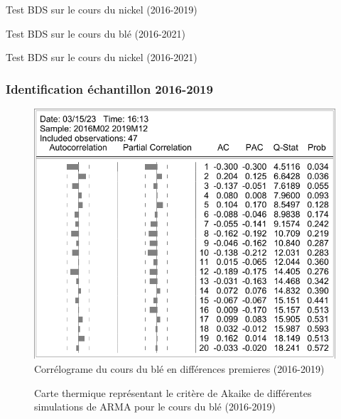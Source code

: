 \documentclass[12pt,a4paper]{article}
\begin{document}
\begin{table}[H]
    \centering
    \caption{Test BDS sur le cours du nickel (2016-2019)}
    \sffamily
    \resizebox{0.9\textwidth}{!}{}
\end{table}

\begin{table}[H]
    \centering
    \caption{Test BDS sur le cours du blé (2016-2021)}
    \sffamily
    \resizebox{0.9\textwidth}{!}{}
\end{table}

\begin{table}[H]
    \centering
    \caption{Test BDS sur le cours du nickel (2016-2021)}
    \sffamily
    \resizebox{0.9\textwidth}{!}{}
\end{table}
\subsubsection{Identification échantillon 2016-2019}
\begin{figure}[H]
    \centering
    \includegraphics[]{annexe/4_3_1_cor_dble19.pdf}
    \caption{Corrélograme du cours du blé en différences premieres (2016-2019)}
    \label{fig:cor_dble19}
\end{figure}

\begin{figure}[H]
    \centering
    \resizebox{\textwidth}{!}{}
    \caption{Carte thermique représentant le critère de Akaike de différentes simulations de ARMA pour le cours du blé (2016-2019)}
    \label{fig:arma_heatmap_19}
\end{figure}
\end{document}
